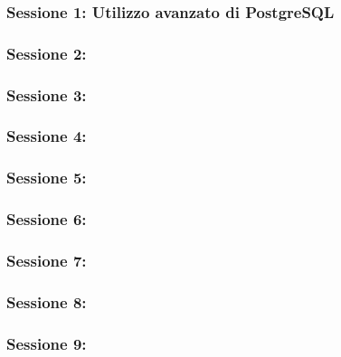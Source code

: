 \subsubsection{Sessione 1: Utilizzo avanzato di PostgreSQL}
\subsubsection{Sessione 2:}
\subsubsection{Sessione 3:}
\subsubsection{Sessione 4:}
\subsubsection{Sessione 5:}
\subsubsection{Sessione 6:}
\subsubsection{Sessione 7:}
\subsubsection{Sessione 8:}
\subsubsection{Sessione 9:}
